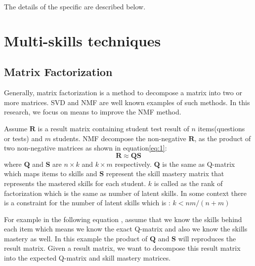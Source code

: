The details of the specific are described below.

\section{Multi-skills techniques}

\subsection{Matrix Factorization}

Generally, matrix factorization is a method to decompose a matrix into two or more matrices. SVD and NMF are well known examples of such methods. In this research, we focus on means to improve the \ac{NMF} method.

Assume $\mathbf{R}$ is a result matrix containing student test result of ${n}$ items(questions or tests) and ${m}$ students. \ac{NMF} decompose the non-negative $\mathbf{R}$, as the product of two non-negative matrices as shown in equation\protect\eqref{eq:1}:
\begin{equation}
\mathbf{R}\approx\mathbf{Q}\mathbf{S}\label{eq:1}
\end{equation}
where $\mathbf{Q}$ and $\mathbf{S}$ are ${n}\times{k}$ and ${k}\times{m}$ respectively. $\mathbf{Q}$ is the same as Q-matrix which maps items to skills and $\mathbf{S}$ represent the skill mastery matrix that represents the mastered skills for each student. ${k}$ is called as the rank of factorization which is the same as number of latent skills. In some context there is a constraint for the number of latent skills which is : $k<nm/(n+m)$ \protect\citep{lee1999learning}

For example in the following equation , assume that we know the skills behind each item which means we know the exact Q-matrix and also we know the skills mastery as well. In this example the product of $\mathbf{Q}$ and $\mathbf{S}$ will reproduces the result matrix. Given a result matrix, we want to decompose this result matrix into the expected Q-matrix and skill mastery matrices.

